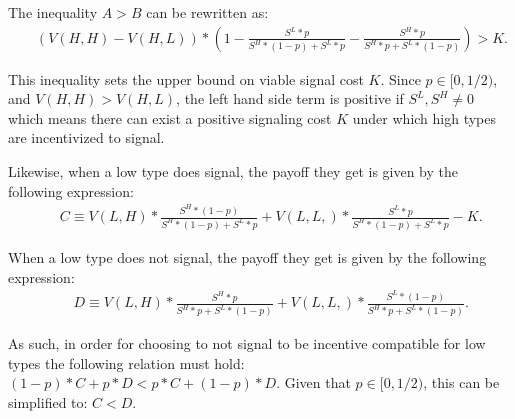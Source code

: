 
The inequality $A>B$ can be rewritten as:
\begin{eqnarray}
&& (V(H,H) - V(H,L))*(1-\frac{S^L*p}{S^H*(1-p)+S^L*p}-\frac{S^H*p}{S^H*p+S^L*(1-p)}) > K. \label{imperfectsignaldynamic6}
\end{eqnarray}

This inequality sets the upper bound on viable signal cost $K$. Since $p \in [0,1/2)$, and $V(H,H)>V(H,L)$, the left hand side term is positive if $S^L, S^H \neq 0$ which means there can exist a positive signaling cost $K$ under which high types are incentivized to signal. 

Likewise, when a low type does signal, the payoff they get is given by the following expression:
\begin{eqnarray}
&& C \equiv V(L,H) * \frac{S^H*(1-p)}{S^H*(1-p)+S^L*p} + V(L,L,) * \frac{S^L*p}{S^H*(1-p)+S^L*p} - K. \label{imperfectsignaldynamic7}
\end{eqnarray}

When a low type does not signal, the payoff they get is given by the following expression:
\begin{eqnarray}
&& D \equiv V(L,H) * \frac{S^H*p}{S^H*p+S^L*(1-p)} + V(L,L,) * \frac{S^L*(1-p)}{S^H*p+S^L*(1-p)}. \label{imperfectsignaldynamic8}
\end{eqnarray}

As such, in order for choosing to not signal to be incentive compatible for low types the following relation must hold: $(1-p)*C + p*D < p*C + (1-p)*D.$ Given that $p \in [0,1/2)$, this can be simplified to: $ C < D$. 
%

